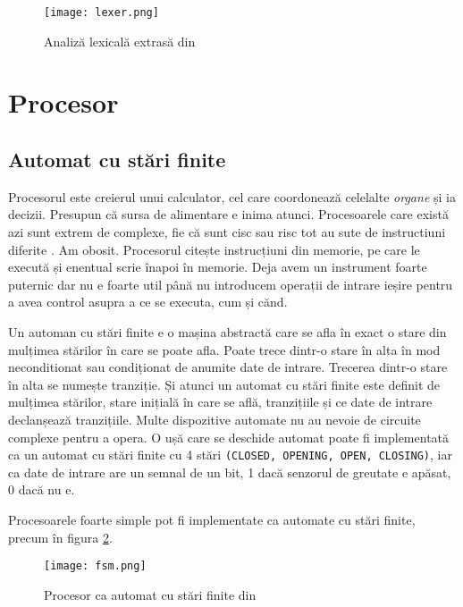 \documentclass[../main.tex]{subfiles}
\begin{document}
\begin{figure}[h]
    \centering
    \texttt{[image: lexer.png]}
    \caption{Analiză lexicală extrasă din \cite{lexer}}
    \label{fig:lexer}
\end{figure}

\section{Procesor}
\subsection{Automat cu stări finite}
Procesorul este creierul unui calculator, cel care coordonează celelalte \emph{organe} și ia decizii. Presupun că sursa
de alimentare e inima atunci. Procesoarele care există azi sunt extrem de complexe, fie că sunt \acrfull{cisc} sau
\acrfull{risc} tot au sute de instructiuni diferite \cite{intel64}. Am obosit. Procesorul citește instrucțiuni din memorie,
pe care le execută și enentual scrie înapoi în memorie. Deja avem un instrument foarte puternic dar nu e foarte util
până nu introducem operații de intrare ieșire pentru a avea control asupra a ce se executa, cum și cănd.

Un automan cu stări finite e o mașina abstractă care se afla în exact o stare din mulțimea stărilor în care se poate afla.
Poate trece dintr-o stare în alta în mod neconditionat sau condiționat de anumite date de intrare. Trecerea dintr-o stare
în alta se numește tranziție. Și atunci un automat cu stări finite este definit de mulțimea stărilor, stare inițială în care
se află, tranzițiile și ce date de intrare declanșează tranzițiile. Multe dispozitive automate nu au nevoie de circuite
complexe pentru a opera. O ușă care se deschide automat poate fi implementată ca un automat cu stări finite cu 4 stări
\texttt{(CLOSED, OPENING, OPEN, CLOSING)}, iar ca date de intrare are un semnal de un bit, 1 dacă senzorul de greutate
e apăsat, 0 dacă nu e.

Procesoarele foarte simple pot fi implementate ca automate cu stări finite, precum în figura \ref{fig:fsm}.

\begin{figure}[h]
    \centering
    \texttt{[image: fsm.png]}
    \caption{Procesor ca automat cu stări finite din \cite{fsm}}
    \label{fig:fsm}
\end{figure}
\end{document}
